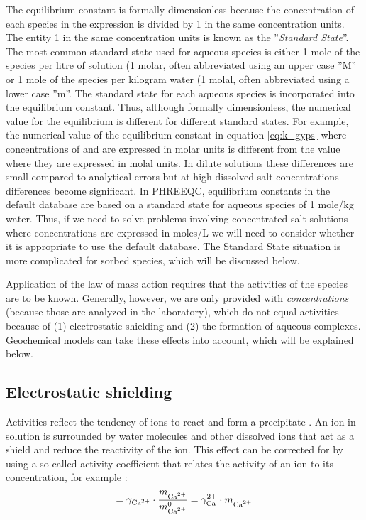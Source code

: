 The equilibrium constant is formally dimensionless because the concentration of each species in the expression is divided by 1 in the same concentration units.  The entity 1 in the same concentration units is known as the ''\textit{Standard State}''.  The most common standard state used for aqueous species is either 1 mole of the species per litre of solution (1 molar, often abbreviated using an upper case ''M'' or 1 mole of the species per kilogram water (1 molal, often abbreviated using a lower case ''m''.  The standard state for each aqueous species is incorporated into the equilibrium constant. Thus, although formally dimensionless, the numerical value for the equilibrium is different for different standard states.  For example, the numerical value of the equilibrium constant in equation \ref{eq:k_gyps} where concentrations of \ca and \su are expressed in molar units is different from the value where they are expressed in molal units. In dilute solutions these differences are small compared to analytical errors but at high dissolved salt concentrations differences become significant. In PHREEQC, equilibrium constants in the default database are based on a standard state for aqueous species of 1 mole/kg water. Thus, if we need to solve problems involving concentrated salt solutions where concentrations are expressed in moles/L we will need to consider whether it is appropriate to use the default database. The Standard State situation is more complicated for sorbed species, which will be discussed below.

Application of the law of mass action requires that the activities of the species are to be known. Generally, however, we are only provided with \textit{concentrations} (because those are analyzed in the laboratory), which do not equal activities because of (1) electrostatic shielding and (2) the formation of aqueous complexes. Geochemical models can take these effects into account, which will be explained below.

\subsection{Electrostatic shielding}
Activities reflect the tendency of ions to react and form a precipitate \citep{ap2005}. An ion in solution is surrounded by water molecules and other dissolved ions that act as a shield and reduce the reactivity of the ion. This effect can be corrected for by using a so-called activity coefficient that relates the activity of an ion to its concentration, for example \ca:
\begin{equation}
[\ca]=\gamma_{\ca} \cdot \frac{\slt{\ca}}{\slt[0]{\ca}} = \gamma_\ca \cdot \slt{\ca}
\end{equation}

